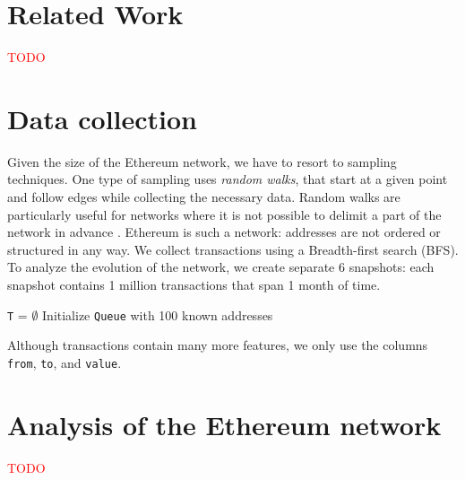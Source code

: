 \documentclass[10pt,a4paper]{article}
\newcommand{\todo}[1]{\textcolor{red}{#1}}
\begin{document}
\begin{multicols}{2}
\section{Related Work}
\todo{TODO}
\section{Data collection}
Given the size of the Ethereum network, we have to resort to sampling techniques. One type of sampling uses \textit{random walks}, that start at a given point and follow edges while collecting the necessary data. Random walks are particularly useful for networks where it is not possible to delimit a part of the network in advance \cite{Becchetti06acomparison}. Ethereum is such a network: addresses are not ordered or structured in any way. We collect transactions using a Breadth-first search (BFS). To analyze the evolution of the network, we create separate 6 snapshots: each snapshot contains 1 million transactions that span 1 month of time.

\medskip
\begin{algorithm}[H]
\SetAlgoLined
\hspace{5pt}\texttt{T} = $\emptyset$\newline
Initialize \texttt{Queue} with 100 known addresses
\end{algorithm}

Although transactions contain many more features, we only use the columns \texttt{from}, \texttt{to}, and \texttt{value}.

\section{Analysis of the Ethereum network}
\todo{TODO}
	

\end{multicols}
\end{document}
